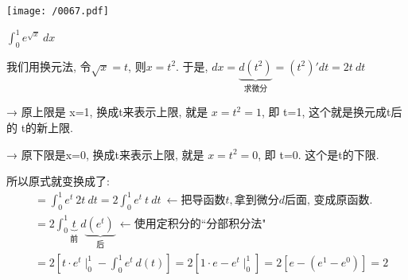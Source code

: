 \documentclass[UTF8]{ctexart}
\begin{document}
	
	
	
	
	
	
	\begin{myEnvSample}
	\texttt{[image: /0067.pdf]}
	\end{myEnvSample}
	

\begin{myEnvSample}
	$\int_0^1{e^{\sqrt{x}}}\ dx$ 
	
	我们用换元法, 令$\sqrt{x}=t$, 则$x=t^2$. 于是, $dx=\underset{\text{求微分}}{\underbrace{d\left( t^2 \right) }}=\left( t^2 \right) 'dt=2t\ dt$
	
	→ 原上限是 x=1, 换成t来表示上限, 就是 $x=t^2=1$, 即 t=1, 这个就是换元成t后的 t的新上限.
	
	→ 原下限是x=0, 换成t来表示上限, 就是 $x=t^2=0$, 即 t=0. 这个是t的下限.
	
	所以原式就变换成了: 
	\begin{align*}
		&=\int_0^1{e^t}\ 2t\ dt=2\int_0^1{e^t}\ t\ dt\ \gets \text{把导函数}t,\text{拿到微分}d\text{后面,\ 变成原函数}.\\
	&=2\int_0^1{\underset{\text{前}}{\underbrace{t}}}\ d\underset{\text{后}}{\underbrace{\left( e^t \right) }}\ \gets \text{使用定积分的``分部积分法"}\\
	&=2\left[ t\cdot e^t\mid_{0}^{1}-\int_0^1{e^t\ d\left( t \right)} \right] =2\left[ 1\cdot e-e^t\mid_{0}^{1} \right] =2\left[ e-\left( e^1-e^0 \right) \right] =2
	\end{align*}


\end{myEnvSample}
	

	
	
	
\end{document}
